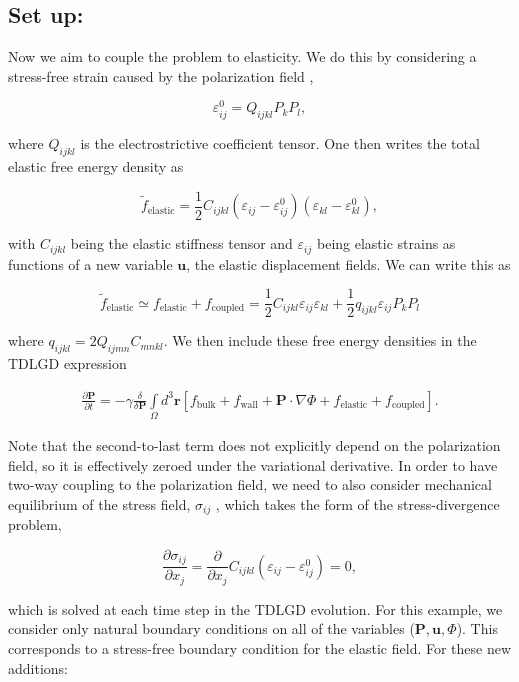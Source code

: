 \documentclass[paper=a4, fontsize=14pt]{scrartcl} %
\numberwithin{equation}{section} %
\numberwithin{figure}{section} %
\numberwithin{table}{section} %
\begin{document}
\subsection*{Set up:}

Now we aim to couple the problem to elasticity. We do this by considering a stress-free strain caused by the polarization field \cite{Li2001, Mangeri2017},

$$\varepsilon_{ij}^0 = Q_{ijkl} P_k P_l,$$

where $Q_{ijkl}$ is the electrostrictive coefficient tensor. One then writes the total elastic free energy density as

$$\tilde{f}_\mathrm{elastic} = \frac{1}{2} C_{ijkl} \left( \varepsilon_{ij} - \varepsilon_{ij}^0\right)\left( \varepsilon_{kl} - \varepsilon_{kl}^0 \right),$$

with $C_{ijkl}$ being the elastic stiffness tensor and $\varepsilon_{ij}$ being elastic strains as functions of a new variable $\textbf{u}$, the elastic displacement fields. We can write this as

$$\tilde{f}_\mathrm{elastic} \simeq f_\mathrm{elastic} + f_\mathrm{coupled} = \frac{1}{2} C_{ijkl} \varepsilon_{ij} \varepsilon_{kl} + \frac{1}{2} q_{ijkl} \varepsilon_{ij} P_k P_l$$

where $q_{ijkl} = 2 Q_{ijmn} C_{mnkl}$. We then include these free energy densities in the TDLGD expression

\begin{align}\nonumber
\frac{\partial \textbf{P}}{\partial t} =  - \gamma \frac{\delta}{\delta \textbf{P}} \int\limits_\Omega d^3 \textbf{r} \left[ f_\mathrm{bulk} +  f_\mathrm{wall} + \textbf{P} \cdot \nabla \Phi  + f_\mathrm{elastic} + f_\mathrm{coupled}\right]. 
\end{align}

Note that the second-to-last term does not explicitly depend on the polarization field, so it is effectively zeroed under the variational derivative. In order to have two-way coupling to the polarization field, we need to also consider mechanical equilibrium of the stress field, $\sigma_{ij}$ , which takes the form of the stress-divergence problem,

$$\frac{\partial \sigma_{ij} }{\partial x_j} = \frac{\partial}{\partial x_j} C_{ijkl} \left(\varepsilon_{ij} - \varepsilon_{ij}^0 \right) = 0,$$

which is solved at each time step in the TDLGD evolution. For this example, we consider only natural boundary conditions on all of the variables ($\textbf{P}, \textbf{u}, \Phi$). This corresponds to a stress-free boundary condition for the elastic field. For these new additions:
\end{document}
